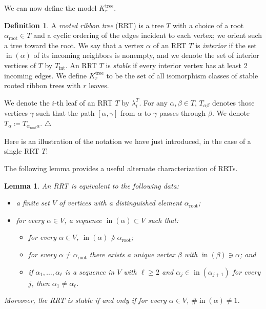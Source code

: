 \documentclass[11pt]{amsart}
\newtheorem{lemma}[theorem]{Lemma}
\theoremstyle{definition}
\newtheorem{definition}[theorem]{Definition}
\theoremstyle{remark}
\theoremstyle{plain}
\newcommand{\on}{\operatorname}
\newcommand{\incom}{\on{in}}
\newcommand{\inte}{{\on{int}}}
\renewcommand{\root}{{\on{root}}}
\newcommand{\tree}{{\on{tree}}}
\begin{document}
\noindent We can now define the model $K^\tree_r$.
\begin{definition}
\label{def:Krtree_set}
A \emph{rooted ribbon tree} (RRT) is a tree $T$ with a choice of a root $\alpha_\root \in T$ and a cyclic ordering of the edges incident to each vertex; we orient such a tree toward the root.
We say that a vertex $\alpha$ of an RRT $T$ is \emph{interior} if the set $\incom(\alpha)$ of its incoming neighbors is nonempty, and we denote the set of interior vertices of $T$ by $T_\inte$.
An RRT $T$ is \emph{stable} if every interior vertex has at least 2 incoming edges.
We define $K^\tree_r$ to be the set of all isomorphism classes of stable rooted ribbon trees with $r$ leaves.

We denote the $i$-th leaf of an RRT $T$ by $\lambda_i^T$.
For any $\alpha, \beta \in T$, $T_{\alpha\beta}$\label{p:Talphabeta} denotes those vertices $\gamma$ such that the path $[\alpha,\gamma]$\label{p:path} from $\alpha$ to $\gamma$ passes through $\beta$.
We denote $T_\alpha \coloneqq T_{\alpha_\root\alpha}$.
\null\hfill$\triangle$
\end{definition}


Here is an illustration of the notation we have just introduced, in the case of a single RRT $T$:

\begin{figure}[H]
\centering
\def\svgwidth{0.8\columnwidth}

\label{fig:RRT_example}
\end{figure}


The following lemma provides a useful alternate characterization of RRTs.

\begin{lemma}
\label{lem:RRT_in}
An RRT is equivalent to the following data:
\begin{itemize}
\item a finite set $V$ of vertices with a distinguished element $\alpha_\root$;

\item for every $\alpha \in V$, a sequence $\incom(\alpha) \subset V$ such that:
\begin{itemize}
\item[(1)] for every $\alpha \in V$, $\incom(\alpha) \not\ni \alpha_\root$;

\item[(2)] for every $\alpha \neq \alpha_\root$ there exists a unique vertex $\beta$ with $\incom(\beta) \ni \alpha$; and

\item[(3)] if $\alpha_1, \ldots, \alpha_\ell$ is a sequence in $V$ with $\ell \geq 2$ and $\alpha_j \in \incom(\alpha_{j+1})$ for every $j$, then $\alpha_1 \neq \alpha_\ell$.
\end{itemize}
\end{itemize}
Moreover, the RRT is stable if and only if for every $\alpha \in V$, $\#\!\incom(\alpha) \neq 1$.
\end{lemma}
\end{document}
